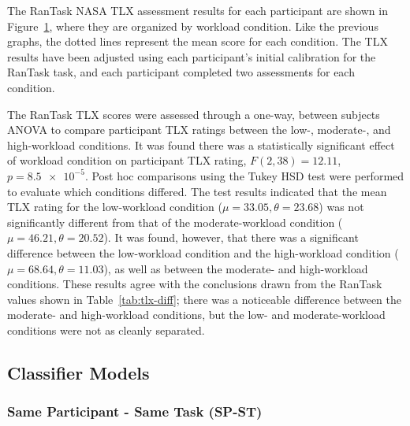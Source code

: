 \documentclass[11pt]{article}
\begin{document}
		The RanTask NASA TLX assessment results for each participant are shown in Figure~\ref{fig:rantask-tlx}, where they are organized by workload condition. Like the previous graphs, the dotted lines represent the mean score for each condition. The TLX results have been adjusted using each participant's initial calibration for the RanTask task, and each participant completed two assessments for each condition.
		
		\begin{figure}
		\centering
		\caption{}
		\label{fig:rantask-tlx}
		\end{figure} 
		
		The RanTask TLX scores were assessed through a one-way, between subjects ANOVA to compare participant TLX ratings between the low-, moderate-, and high-workload conditions. It was found there was a statistically significant effect of workload condition on participant TLX rating, \(F(2,38) = 12.11\), \(p = \num{8.5e-5}\). Post hoc comparisons using the Tukey HSD test were performed to evaluate which conditions differed. The test results indicated that the mean TLX rating for the low-workload condition (\(\mu = 33.05, \theta = 23.68 \)) was not significantly different from that of the moderate-workload condition (\(\mu = 46.21, \theta = 20.52\)). It was found, however, that there was a significant difference between the low-workload condition and the high-workload condition (\(\mu = 68.64, \theta = 11.03\)), as well as between the moderate- and high-workload conditions. These results agree with the conclusions drawn from the RanTask values shown in Table~\ref{tab:tlx-diff}; there was a noticeable difference between the moderate- and high-workload conditions, but the low- and moderate-workload conditions were not as cleanly separated.
		
	\subsection{Classifier Models}
	
		\subsubsection{Same Participant - Same Task (SP-ST)}
		\begin{figure}
		\centering
		\caption{}
		\label{fig:sp-st}
		\end{figure} 
		
\end{document}
